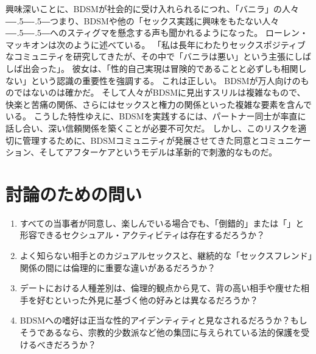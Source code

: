 \documentclass[paper=a4,book,openany]{jlreq}
\newcommand{\ig}[1]{}           %
\def\DDASH{―\kern-.5\zw―\kern-.5\zw―} %
\begin{document}
興味深いことに、BDSMが社会的に受け入れられるにつれ、「バニラ」の人々{\DDASH}つまり、BDSMや他の「セックス実践に興味をもたない人々{\DDASH}へのスティグマを懸念する声も聞かれるようになった。
ローレン・マッキオン\ig{(Lauren McKeon)}は次のように述べている。
「私は長年にわたりセックスポジティブなコミュニティを研究してきたが、その中で「バニラは悪い」という主張にしばしば出会った」。
彼女は、「性的自己実現は冒険的であることと必ずしも相関しない」という認識の重要性を強調する\citep{mckeon17:_when_it_comes}。
これは正しい。
BDSMが万人向けのものではないのは確かだ。
そして人々がBDSMに見出すスリルは複雑なもので、快楽と苦痛の関係、さらにはセックスと権力の関係といった複雑な要素を含んでいる。
こうした特性ゆえに、BDSMを実践するには、パートナー同士が率直に話し合い、深い信頼関係を築くことが必要不可欠だ。
しかし、このリスクを適切に管理するために、BDSMコミュニティが発展させてきた同意とコミュニケーション、そしてアフターケアというモデルは革新的で刺激的なものだ。

\section{討論のための問い}

\begin{enumerate}
    \item すべての当事者が同意し、楽しんでいる場合でも、「倒錯的」または「」と形容できるセクシュアル・アクティビティは存在するだろうか？
    \item よく知らない相手とのカジュアルセックスと、継続的な「セックスフレンド」関係の間には倫理的に重要な違いがあるだろうか？
    \item デートにおける人種差別は、倫理的観点から見て、背の高い相手や痩せた相手を好むといった外見に基づく他の好みとは異なるだろうか？
    \item BDSMへの嗜好は正当な性的アイデンティティと見なされるだろうか？もしそうであるなら、宗教的少数派など他の集団に与えられている法的保護を受けるべきだろうか？
\end{enumerate}
\end{document}
